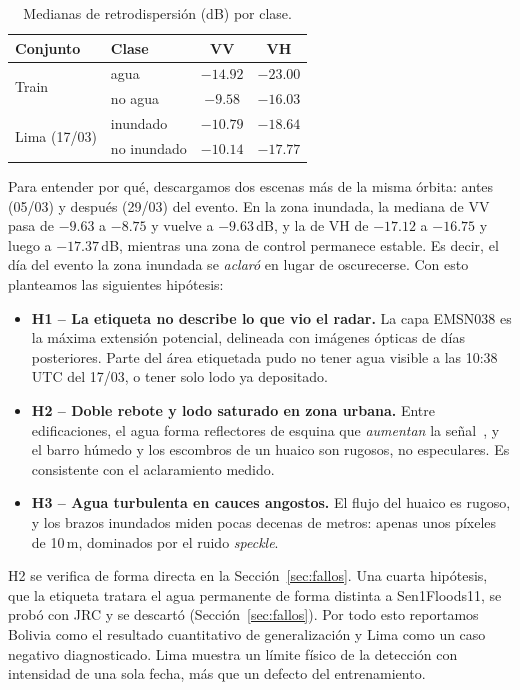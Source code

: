 \begin{table}[t]
\centering
\caption{Medianas de retrodispersión (dB) por clase.}
\label{tab:medianas}
\begin{tabular}{llcc}
\toprule
Conjunto & Clase & VV & VH \\
\midrule
\multirow{2}{*}{Train} & agua     & $-14.92$ & $-23.00$ \\
                       & no agua  & $-9.58$  & $-16.03$ \\
\midrule
\multirow{2}{*}{Lima (17/03)} & inundado    & $-10.79$ & $-18.64$ \\
                              & no inundado & $-10.14$ & $-17.77$ \\
\bottomrule
\end{tabular}
\end{table}

Para entender por qué, descargamos dos escenas más de la misma órbita: antes (05/03) y después
(29/03) del evento. En la zona inundada, la mediana de VV pasa de $-9.63$ a $-8.75$ y vuelve a
$-9.63$\,dB, y la de VH de $-17.12$ a $-16.75$ y luego a $-17.37$\,dB, mientras una zona de
control permanece estable. Es decir, el día del evento la zona inundada se \emph{aclaró} en lugar
de oscurecerse. Con esto planteamos las siguientes hipótesis:
\begin{itemize}
  \item \textbf{H1 -- La etiqueta no describe lo que vio el radar.} La capa EMSN038 es la máxima
        extensión potencial, delineada con imágenes ópticas de días posteriores. Parte del área
        etiquetada pudo no tener agua visible a las 10:38 UTC del 17/03, o tener solo lodo ya
        depositado.
  \item \textbf{H2 -- Doble rebote y lodo saturado en zona urbana.} Entre edificaciones, el agua
        forma reflectores de esquina que \emph{aumentan} la señal~\cite{zhao2022urbanaware}, y
        el barro húmedo y los escombros de un huaico son rugosos, no especulares. Es consistente
        con el aclaramiento medido.
  \item \textbf{H3 -- Agua turbulenta en cauces angostos.} El flujo del huaico es rugoso, y los
        brazos inundados miden pocas decenas de metros: apenas unos píxeles de 10\,m, dominados
        por el ruido \emph{speckle}.
\end{itemize}
H2 se verifica de forma directa en la Sección~\ref{sec:fallos}. Una cuarta hipótesis, que la
etiqueta tratara el agua permanente de forma distinta a Sen1Floods11, se probó con JRC y se
descartó (Sección~\ref{sec:fallos}). Por todo esto reportamos Bolivia como el resultado
cuantitativo de generalización y Lima como un caso negativo diagnosticado. Lima muestra un
límite físico de la detección con intensidad de una sola fecha, más que un defecto del
entrenamiento.
